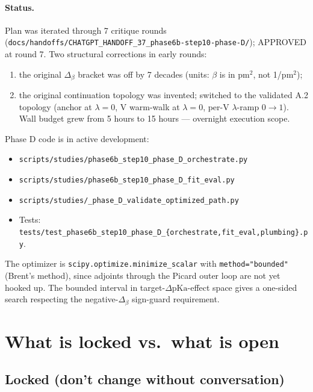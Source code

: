 \documentclass[11pt]{article}
\begin{document}
\paragraph{Status.} Plan was iterated through 7 critique rounds
(\texttt{docs/handoffs/CHATGPT\_HANDOFF\_37\_phase6b-step10-phase-D/});
APPROVED at round 7. Two structural corrections in early rounds:
\begin{enumerate}[leftmargin=*]
\item the original $\Delta_\beta$ bracket was off by 7 decades
      (units: $\beta$ is in pm$^{2}$, not 1/pm$^{2}$);
\item the original continuation topology was invented; switched to
      the validated A.2 topology (anchor at $\lambda=0$, V warm-walk
      at $\lambda=0$, per-V $\lambda$-ramp $0 \to 1$). Wall budget
      grew from 5 hours to 15 hours --- overnight execution scope.
\end{enumerate}

Phase D code is in active development:
\begin{itemize}[leftmargin=*]
\item \texttt{scripts/studies/phase6b\_step10\_phase\_D\_orchestrate.py}
\item \texttt{scripts/studies/phase6b\_step10\_phase\_D\_fit\_eval.py}
\item \texttt{scripts/studies/\_phase\_D\_validate\_optimized\_path.py}
\item Tests:
      \texttt{tests/test\_phase6b\_step10\_phase\_D\_\{orchestrate,fit\_eval,plumbing\}.py}.
\end{itemize}

The optimizer is \texttt{scipy.optimize.minimize\_scalar} with
\texttt{method="bounded"} (Brent's method), since adjoints through
the Picard outer loop are not yet hooked up. The bounded interval
in target-$\Delta\mathrm{pKa}$-effect space gives a one-sided search
respecting the negative-$\Delta_\beta$ sign-guard requirement.

\section{What is locked vs.\ what is open}

\subsection{Locked (don't change without conversation)}
\end{document}
